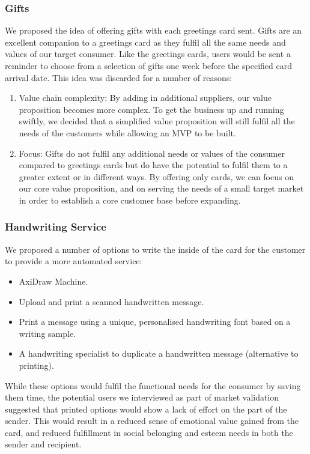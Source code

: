 \documentclass[10pt,a4paper]{article}
\begin{document}
\subsubsection*{Gifts}
We proposed the idea of offering gifts with each greetings card sent. Gifts are an excellent companion to a greetings card as they fulfil all the same needs and values of our target consumer. Like the greetings cards, users would be sent a reminder to choose from a selection of gifts one week before the specified card arrival date.
This idea was discarded for a number of reasons:
\begin{enumerate}
  \item Value chain complexity: By adding in additional suppliers, our value proposition becomes more complex. To get the business up and running swiftly, we decided that a simplified value proposition will still fulfil all the needs of the customers while allowing an MVP to be built.
  \item Focus: Gifts do not fulfil any additional needs or values of the consumer compared to greetings cards but do have the potential to fulfil them to a greater extent or in different ways. By offering only cards, we can focus on our core value proposition, and on serving the needs of a small target market in order to establish a core customer base before expanding.
\end{enumerate}

\subsubsection*{Handwriting Service}
We proposed a number of options to write the inside of the card for the customer to provide a more automated service:
\begin{itemize}
  \item AxiDraw Machine.
  \item Upload and print a scanned handwritten message.
  \item Print a message using a unique, personalised handwriting font based on a writing sample.
  \item A handwriting specialist to duplicate a handwritten message (alternative to printing).
\end{itemize}

While these options would fulfil the functional needs for the consumer by saving them time, the potential users we interviewed as part of market validation suggested that printed options would show a lack of effort on the part of the sender. This would result in a reduced sense of emotional value gained from the card, and reduced fulfillment in social belonging and esteem needs in both the sender and recipient.
\end{document}
